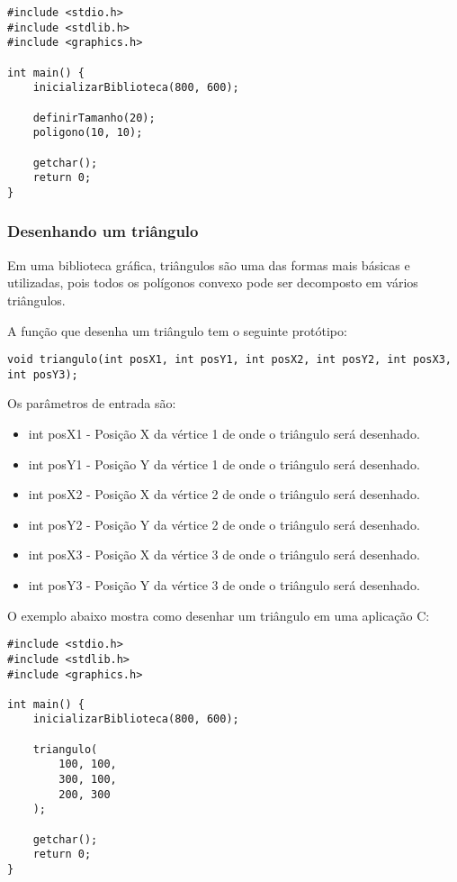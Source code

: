 \documentclass[12pt, %
openright,
oneside, %
a4paper,    %
brazil]{facom-ufu-abntex2}
\begin{document}
\begin{lstlisting}
#include <stdio.h>
#include <stdlib.h>
#include <graphics.h>

int main() {
    inicializarBiblioteca(800, 600);

    definirTamanho(20);
    poligono(10, 10);

    getchar();
    return 0;
}
\end{lstlisting}

\subsubsection{Desenhando um triângulo}
Em uma biblioteca gráfica, triângulos são uma das formas mais básicas e utilizadas, pois todos os polígonos convexo pode ser decomposto em vários triângulos.

A função que desenha um triângulo tem o seguinte protótipo:

\begin{lstlisting}
void triangulo(int posX1, int posY1, int posX2, int posY2, int posX3, int posY3);
\end{lstlisting}

Os parâmetros de entrada são:

\begin{itemize}
    \item int posX1 - Posição X da vértice 1 de onde o triângulo será desenhado.
    \item int posY1 - Posição Y da vértice 1 de onde o triângulo será desenhado.

    \item int posX2 - Posição X da vértice 2 de onde o triângulo será desenhado.
    \item int posY2 - Posição Y da vértice 2 de onde o triângulo será desenhado.

    \item int posX3 - Posição X da vértice 3 de onde o triângulo será desenhado.
    \item int posY3 - Posição Y da vértice 3 de onde o triângulo será desenhado.
\end{itemize}

O exemplo abaixo mostra como desenhar um triângulo em uma aplicação C:

\begin{lstlisting}
#include <stdio.h>
#include <stdlib.h>
#include <graphics.h>

int main() {
    inicializarBiblioteca(800, 600);

    triangulo(
        100, 100,
        300, 100,
        200, 300
    );

    getchar();
    return 0;
}
\end{lstlisting}
\end{document}
